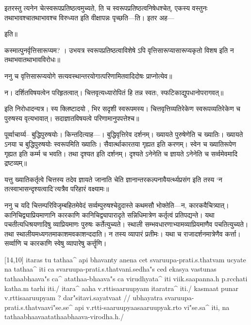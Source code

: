 इतरस्तु त्यनेन चेत्स्वरूपप्रतिष्ठत्वमुच्यते, ति च स्वरूपप्रतिष्ठत्वनिषेधश्चेत्, एकस्य वस्तुनः तथाभावश्चातथाभावश्च विरुध्यत इति वीक्षापन्नः पृच्छति---ति। इतर अह---


इति॥

कस्मात्पुनर्वृत्तिसारूप्यम? । उभयत्र स्वरूपप्रतिष्ठत्वाविशेषे ऽपि वृत्तिसारूप्यासारूप्यकृतो विशष इति न तथाभवातथाभावविरोधः॥

ननु च वृत्तिसारूप्ययोगे सत्यवस्थान्तरयोगात्परिणामितवादिदोषः प्राप्नोत्येव॥

न। दर्शितविषयत्वेन परिहृतत्वात्। चित्तवृत्यध्यारोपितं हि तन्न स्वतः, स्फटिकाद्युपधानोपरागवत्॥

 इति निरोधादन्यत्र। स्य क्लिष्टादयो , भिर सदृशी  स्वरूपमस्य। %
चित्तवृत्तिव्यतिरेकेण स्वरूपव्यतिरेकेण च पुरुषस्य वृत्यभावात्। सदाज्ञातविषयत्वे परिणामानुपपत्तेश्च॥

 पूर्व्वाचार्य्य-- बुद्धिपुरुषयोः। किन्तदित्याह---। बुद्धिवृत्तिरेव दर्शनम्। ख्यायते पुरुषेणेति च ख्यातिः। ख्यायते ऽनया च बुद्धिपुरुषयोः स्वरूपमिति ख्यातिः। सैवार्त्थाकारतया गृह्यत इति करणम्। स्वेन च ख्यातिरूपेण गृह्यत इति कर्म्म च भवति। तथा दृश्यत इति दर्शनम्। दृश्यते ऽनेनेति च ज्ञायते ऽनेनेति च सर्व्वमेवमादि द्रष्टव्यम्॥

यत्तु ख्यातिकर्तृत्वे चित्तस्य तदेव ज्ञायते जानाति चेति ज्ञानान्तरकल्पनावैयर्त्थ्यप्रसंग इति तस्य `न तत्स्वाभासन्दृश्यत्वादि'त्यत्रैव परिहारं वक्ष्यामः॥ %

ननु च यदि चित्तम्परिविजृम्बहितमेवेदं सर्व्वम्पुरुषश्चेदुदास्ते कथमसौ भोक्तेति—न, कारकवैचित्र्यात्। कानिचिद्व्याप्रियमाणानि कारकाणि कानिचिद्व्यापारादृते सन्निधिमात्रेण कर्तृत्वं प्रतिपद्यन्ते। यथा पचतीत्यधिश्रयणादिषु व्याप्रियमाणः पुरुषः कर्तेत्युच्यते। स्थाली सम्भवधारणाभ्यामव्याप्रियमाणैव पचतित्युच्यते। तथा स्थालीयमध्यगतमाकाशमवकाशन्ददाति। न तस्य व्यापारं प्रतीमः। यथा च राजादर्शनमात्रेणैव कर्त्ता। सर्व्वाणि च कारकाणि स्वेषु व्यापारेषु कर्त्तॄणि।





[14,10]	itaras tu tathaa^ api bhavanty anena cet svaruupa-prati.s.thatvam ucyate 
na tathaa^ iti ca svaruupa-prati.s.thatvani.sedha"s ced ekasya vastunas tathaabhaava"s 
ca^ atathaa-bhaava"s ca virudhyata^ iti viik.saapanna.h p.rcchati katha.m tarhi 
iti./ itara^ aaha v.rttisaaruupyam itaratra^ iti./ kasmaat punar v.rttisaaruupyam ? 
dar"sitavi.sayatvaat // ubhayatra svaruupa-prati.s.thatvaavi"se.se^ api 
v.rtti-saaruupyaasaaruupyak.rto vi"se.sa^ iti, na tathaabhaavaatathaabhaava-virodha.h./

